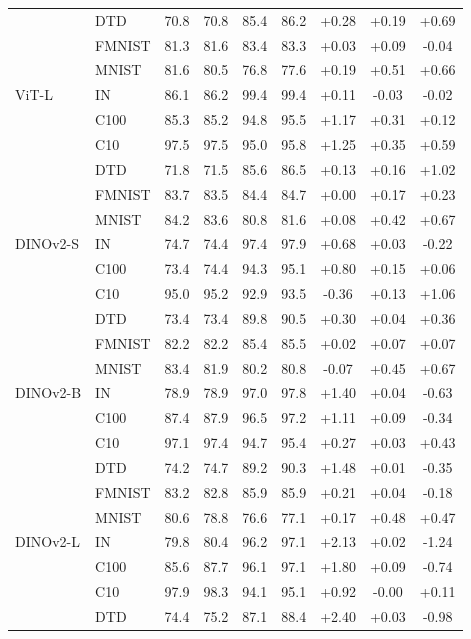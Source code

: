 \begin{table}[H]
\begin{tabular}{llccccccc}
 & DTD & 70.8 & 70.8 & 85.4 & 86.2 & +0.28 & +0.19 & +0.69 \\
 & FMNIST & 81.3 & 81.6 & 83.4 & 83.3 & +0.03 & +0.09 & -0.04 \\
 & MNIST & 81.6 & 80.5 & 76.8 & 77.6 & +0.19 & +0.51 & +0.66 \\
\midrule
ViT-L & IN & 86.1 & 86.2 & 99.4 & 99.4 & +0.11 & -0.03 & -0.02 \\
 & C100 & 85.3 & 85.2 & 94.8 & 95.5 & +1.17 & +0.31 & +0.12 \\
 & C10 & 97.5 & 97.5 & 95.0 & 95.8 & +1.25 & +0.35 & +0.59 \\
 & DTD & 71.8 & 71.5 & 85.6 & 86.5 & +0.13 & +0.16 & +1.02 \\
 & FMNIST & 83.7 & 83.5 & 84.4 & 84.7 & +0.00 & +0.17 & +0.23 \\
 & MNIST & 84.2 & 83.6 & 80.8 & 81.6 & +0.08 & +0.42 & +0.67 \\
\midrule
DINOv2-S & IN & 74.7 & 74.4 & 97.4 & 97.9 & +0.68 & +0.03 & -0.22 \\
 & C100 & 73.4 & 74.4 & 94.3 & 95.1 & +0.80 & +0.15 & +0.06 \\
 & C10 & 95.0 & 95.2 & 92.9 & 93.5 & -0.36 & +0.13 & +1.06 \\
 & DTD & 73.4 & 73.4 & 89.8 & 90.5 & +0.30 & +0.04 & +0.36 \\
 & FMNIST & 82.2 & 82.2 & 85.4 & 85.5 & +0.02 & +0.07 & +0.07 \\
 & MNIST & 83.4 & 81.9 & 80.2 & 80.8 & -0.07 & +0.45 & +0.67 \\
\midrule
DINOv2-B & IN & 78.9 & 78.9 & 97.0 & 97.8 & +1.40 & +0.04 & -0.63 \\
 & C100 & 87.4 & 87.9 & 96.5 & 97.2 & +1.11 & +0.09 & -0.34 \\
 & C10 & 97.1 & 97.4 & 94.7 & 95.4 & +0.27 & +0.03 & +0.43 \\
 & DTD & 74.2 & 74.7 & 89.2 & 90.3 & +1.48 & +0.01 & -0.35 \\
 & FMNIST & 83.2 & 82.8 & 85.9 & 85.9 & +0.21 & +0.04 & -0.18 \\
 & MNIST & 80.6 & 78.8 & 76.6 & 77.1 & +0.17 & +0.48 & +0.47 \\
\midrule
DINOv2-L & IN & 79.8 & 80.4 & 96.2 & 97.1 & +2.13 & +0.02 & -1.24 \\
 & C100 & 85.6 & 87.7 & 96.1 & 97.1 & +1.80 & +0.09 & -0.74 \\
 & C10 & 97.9 & 98.3 & 94.1 & 95.1 & +0.92 & -0.00 & +0.11 \\
 & DTD & 74.4 & 75.2 & 87.1 & 88.4 & +2.40 & +0.03 & -0.98 \\

\end{tabular}
\end{table}
